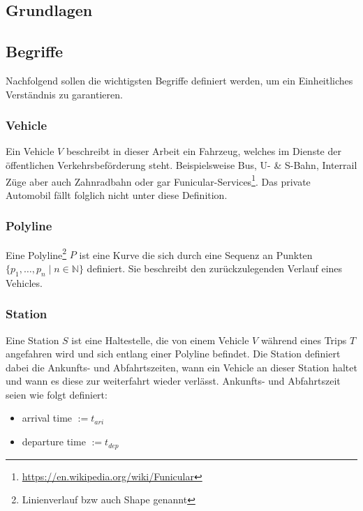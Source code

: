 \begin{newpage}
	
	\section{Grundlagen}
	\label{sec:Grundlagen}

  \subsection{Begriffe}
  \label{sub:begriffe}
    Nachfolgend sollen die wichtigsten Begriffe definiert werden, um ein Einheitliches Verständnis zu garantieren.

    \subsubsection{Vehicle}
    \label{ssub:vehicle}
      Ein Vehicle $V$ beschreibt in dieser Arbeit ein Fahrzeug, welches im Dienste der öffentlichen Verkehrsbeförderung steht. Beispielsweise Bus, U- \& S-Bahn, Interrail Züge aber auch Zahnradbahn oder gar Funicular-Services\footnote{\url{https://en.wikipedia.org/wiki/Funicular}}. Das private Automobil fällt folglich nicht unter diese Definition.

    \subsubsection{Polyline}
    \label{ssub:polyline}
      Eine Polyline\footnote{Linienverlauf bzw auch Shape genannt} $P$ ist eine Kurve die sich durch eine Sequenz an Punkten $\{ p_1, \dotsc, p_n \;|\; n \in \mathbb{N} \}$ definiert. Sie beschreibt den zurückzulegenden Verlauf eines Vehicles.

    \subsubsection{Station}
    \label{ssub:station}
      Eine Station $S$ ist eine Haltestelle, die von einem Vehicle $V$ während eines Trips $T$ angefahren wird und sich entlang einer Polyline befindet. Die Station definiert dabei die Ankunfts- und Abfahrtszeiten, wann ein Vehicle an dieser Station haltet und wann es diese zur weiterfahrt wieder verlässt. Ankunfts- und Abfahrtszeit seien wie folgt definiert:

      \begin{itemize}[label={}]
        \item arrival time $ := t_{ari}$
        \item departure time $ := t_{dep}$
      \end{itemize}


\end{newpage}
